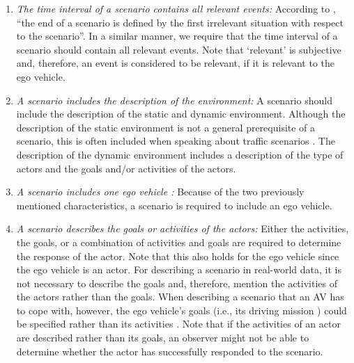 \begin{enumerate}
	\item\textit{The time interval of a scenario contains all relevant events:}
	According to \textcite{geyer2014}, ``the end of a scenario is defined by the first irrelevant situation with respect to the scenario''. In a similar manner, we require that the time interval of a scenario should contain all relevant events. Note that `relevant' is subjective and, therefore, an event is considered to be relevant, if it is relevant to the ego vehicle.

	\item\textit{A scenario includes the description of the environment:}
	A scenario should include the description of the static and dynamic environment.
	Although the description of the static environment is not a general prerequisite of a scenario, this is often included when speaking about traffic scenarios \autocite{geyer2014, ulbrich2015, elrofai2016scenario, ebner2011identifying, althoff2017CommonRoad}.
	The description of the dynamic environment includes a description of the type of actors and the goals and/or activities of the actors.
	
	\cstartb
	\item\textit{A scenario includes one ego vehicle \autocite{geyer2014, elrofai2016scenario}:}
	Because of the two previously mentioned characteristics, a scenario is required to include an ego vehicle.
	\cendb
	
	
	\item\textit{A scenario describes the goals or activities of the \cstartb actors:\cendb}
	\cstartb Either the activities, the goals, or a combination of activities and goals are required to determine the response of the actor. \cendb
	Note that this also holds for the ego vehicle since the ego vehicle is an actor.
	For describing a scenario in real-world data, it is not necessary to describe the goals and, therefore, \textcite{elrofai2016scenario} mention the activities of the \cstartb actors \cendb rather than the goals. When describing a scenario that an AV has to cope with, however, the ego vehicle's goals (i.e., its driving mission \autocite{geyer2014}) could be specified rather than its activities \autocite{ulbrich2015}. Note that if the activities of \cstartb an actor \cendb are described rather than its goals, an observer might not be able to determine whether the \cstartb actor \cendb has successfully responded to the scenario.
\end{enumerate}


